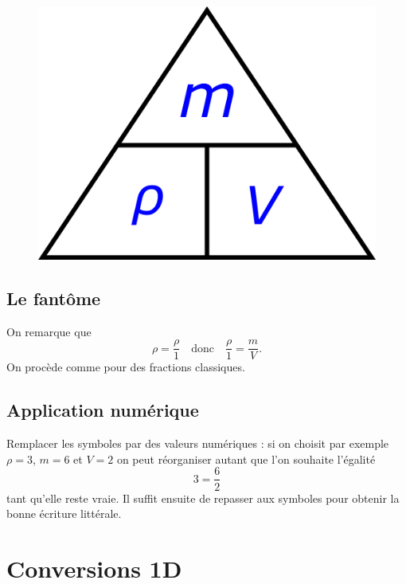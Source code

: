 \begin{figure}[h]
\center
\includegraphics[scale=0.5]{images/pyramide_fraction.png}
\end{figure}

\subsection*{Le  \fg{} fantôme}

On remarque que
\begin{equation}
\rho = \frac{\rho}{1} \quad \text{donc} \quad \frac{\rho}{1} = \frac{m}{V}.
\nonumber
\end{equation}
On procède comme pour des fractions classiques.

\subsection*{Application numérique}

Remplacer les symboles par des valeurs numériques : si on choisit par exemple $\rho=3$, $m=6$ et $V=2$ on peut réorganiser autant que l'on souhaite l'égalité
\begin{equation}
3=\frac{6}{2}
\nonumber
\end{equation}
tant qu'elle reste vraie.
Il suffit ensuite de repasser aux symboles pour obtenir la bonne écriture littérale.

\section*{Conversions 1D}

